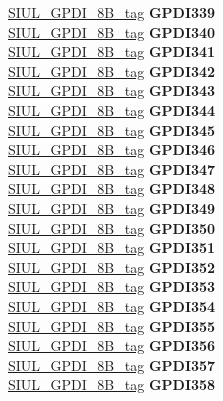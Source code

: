 \begin{DoxyCompactItemize}
\begin{tabbing}
\>\>\mbox{\hyperlink{unionSIUL__GPDI__8B__tag}{SIUL\_GPDI\_8B\_tag}} {\bfseries GPDI339}\\
\>\>\mbox{\hyperlink{unionSIUL__GPDI__8B__tag}{SIUL\_GPDI\_8B\_tag}} {\bfseries GPDI340}\\
\>\>\mbox{\hyperlink{unionSIUL__GPDI__8B__tag}{SIUL\_GPDI\_8B\_tag}} {\bfseries GPDI341}\\
\>\>\mbox{\hyperlink{unionSIUL__GPDI__8B__tag}{SIUL\_GPDI\_8B\_tag}} {\bfseries GPDI342}\\
\>\>\mbox{\hyperlink{unionSIUL__GPDI__8B__tag}{SIUL\_GPDI\_8B\_tag}} {\bfseries GPDI343}\\
\>\>\mbox{\hyperlink{unionSIUL__GPDI__8B__tag}{SIUL\_GPDI\_8B\_tag}} {\bfseries GPDI344}\\
\>\>\mbox{\hyperlink{unionSIUL__GPDI__8B__tag}{SIUL\_GPDI\_8B\_tag}} {\bfseries GPDI345}\\
\>\>\mbox{\hyperlink{unionSIUL__GPDI__8B__tag}{SIUL\_GPDI\_8B\_tag}} {\bfseries GPDI346}\\
\>\>\mbox{\hyperlink{unionSIUL__GPDI__8B__tag}{SIUL\_GPDI\_8B\_tag}} {\bfseries GPDI347}\\
\>\>\mbox{\hyperlink{unionSIUL__GPDI__8B__tag}{SIUL\_GPDI\_8B\_tag}} {\bfseries GPDI348}\\
\>\>\mbox{\hyperlink{unionSIUL__GPDI__8B__tag}{SIUL\_GPDI\_8B\_tag}} {\bfseries GPDI349}\\
\>\>\mbox{\hyperlink{unionSIUL__GPDI__8B__tag}{SIUL\_GPDI\_8B\_tag}} {\bfseries GPDI350}\\
\>\>\mbox{\hyperlink{unionSIUL__GPDI__8B__tag}{SIUL\_GPDI\_8B\_tag}} {\bfseries GPDI351}\\
\>\>\mbox{\hyperlink{unionSIUL__GPDI__8B__tag}{SIUL\_GPDI\_8B\_tag}} {\bfseries GPDI352}\\
\>\>\mbox{\hyperlink{unionSIUL__GPDI__8B__tag}{SIUL\_GPDI\_8B\_tag}} {\bfseries GPDI353}\\
\>\>\mbox{\hyperlink{unionSIUL__GPDI__8B__tag}{SIUL\_GPDI\_8B\_tag}} {\bfseries GPDI354}\\
\>\>\mbox{\hyperlink{unionSIUL__GPDI__8B__tag}{SIUL\_GPDI\_8B\_tag}} {\bfseries GPDI355}\\
\>\>\mbox{\hyperlink{unionSIUL__GPDI__8B__tag}{SIUL\_GPDI\_8B\_tag}} {\bfseries GPDI356}\\
\>\>\mbox{\hyperlink{unionSIUL__GPDI__8B__tag}{SIUL\_GPDI\_8B\_tag}} {\bfseries GPDI357}\\
\>\>\mbox{\hyperlink{unionSIUL__GPDI__8B__tag}{SIUL\_GPDI\_8B\_tag}} {\bfseries GPDI358}\\

\end{tabbing}
\end{DoxyCompactItemize}
